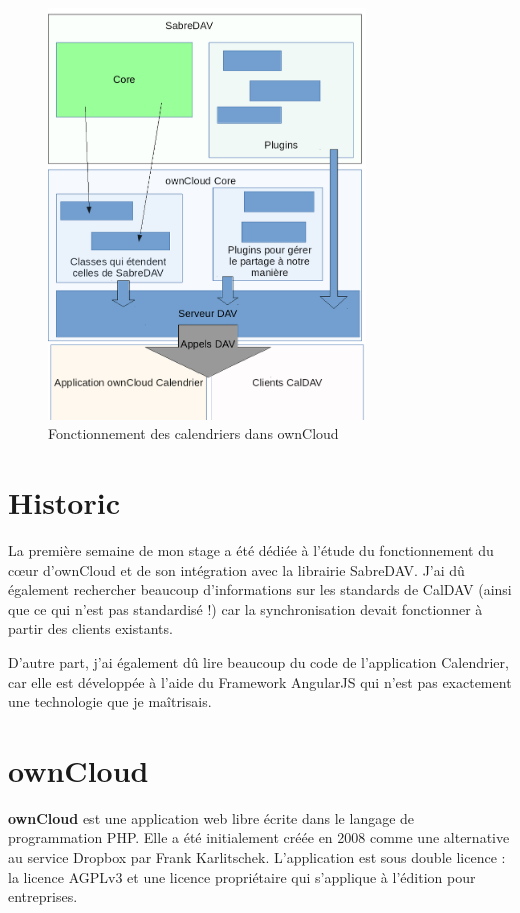 \documentclass[10pt,a4paper, twoside]{report}
\begin{document}
	\begin{figure}[ht]
		\centering
		\includegraphics[width=0.75\textwidth]{images/schema.png}
		\caption*{Fonctionnement des calendriers dans ownCloud}
		\label{normal_case}
	\end{figure}
	
	\section{Historic}
	La première semaine de mon stage a été dédiée à l'étude du fonctionnement du cœur d'ownCloud et de son intégration avec la librairie SabreDAV. J'ai dû également rechercher beaucoup d'informations sur les standards de CalDAV (ainsi que ce qui n'est pas standardisé !) car la synchronisation devait fonctionner à partir des clients existants.
	
	D'autre part, j'ai également dû lire beaucoup du code de l'application Calendrier, car elle est développée à l'aide du Framework AngularJS qui n'est pas exactement une technologie que je maîtrisais.
	
	\section{ownCloud}
	\textbf{ownCloud} est une application web libre écrite dans le langage de programmation PHP. Elle a été initialement créée en 2008 comme une alternative au service Dropbox par Frank Karlitschek. L'application est sous double licence : la licence AGPLv3 et une licence propriétaire qui s'applique à l'édition pour entreprises.
	
\end{document}
